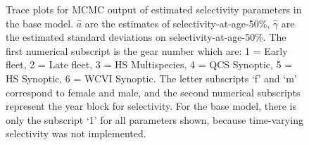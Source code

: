 \documentclass[11pt]{book}
\begin{document}
\begin{figure}[H]

{\centering {} 

}

\caption{Trace plots for MCMC output of estimated selectivity parameters in the base model. \(\hat{a}\) are the estimates of selectivity-at-age-50\%, \(\hat{\gamma}\) are the estimated standard deviations on selectivity-at-age-50\%. The first numerical subscript is the gear number which are: 1 = Early fleet, 2 = Late fleet, 3 = HS Multispecies, 4 = QCS Synoptic, 5 = HS Synoptic, 6 = WCVI Synoptic. The letter subscripts `f' and `m' correspond to female and male, and the second numerical subscripts represent the year block for selectivity. For the base model, there is only the subscript `1' for all parameters shown, because time-varying selectivity was not implemented.}\label{fig:fig-base-trace-selex}
\end{figure}
\end{document}
